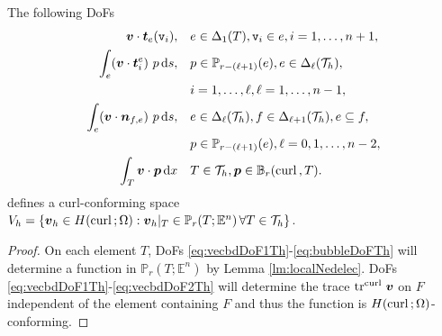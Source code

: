 \documentclass[10pt]{amsart}
\begin{document}
\begin{lemma}\label{lm:nedelec}
The following {\rm DoFs}
\begin{align}
\label{eq:vecbdDoF0Th}
\boldsymbol v\cdot \boldsymbol t_{e}(\texttt{v}_i), & \quad e\in \Delta_{1}(T), \texttt{v}_i\in e,  i=1,\ldots, n+1, \\
\label{eq:vecbdDoF1Th}
\int_e (\boldsymbol v\cdot \boldsymbol t_i^e)\ p \,{\rm d} s, &\quad  p\in \mathbb P_{r - (\ell +1)} (e), e\in \Delta_{\ell}(\mathcal T_h),\\
& \quad  i=1,\ldots, \ell, \ell = 1,\ldots, n-1, \notag\\
\label{eq:vecbdDoF2Th}
\int_e (\boldsymbol v\cdot \boldsymbol n_{f,e})\ p \,{\rm d} s, &\quad  e\in \Delta_{\ell}(\mathcal T_h), f\in \Delta_{\ell+1}(\mathcal T_h), e\subseteq f, \\
& \quad p\in \mathbb P_{r - (\ell +1)} (e), \ell = 0,1,\ldots, n-2, \notag\\
\int_T \boldsymbol v \cdot \boldsymbol p \,{\rm d}x&\quad T\in\mathcal T_h, \boldsymbol p\in \mathbb B_r({\rm curl\,}, T). \label{eq:bubbleDoFTh}
\end{align}
defines a curl-conforming space $V_h=\{\boldsymbol v_h\in H({\rm curl\,}; \Omega): \boldsymbol v_h|_T\in\mathbb P_r(T; \mathbb E^n) \, \forall T\in\mathcal T_h\}$.
\end{lemma}
\begin{proof}
On each element $T$, DoFs \eqref{eq:vecbdDoF1Th}-\eqref{eq:bubbleDoFTh} will determine a function in $\mathbb P_r(T; \mathbb E^n)$ by Lemma \ref{lm:localNedelec}. DoFs \eqref{eq:vecbdDoF1Th}-\eqref{eq:vecbdDoF2Th} will determine the trace $\operatorname{tr}^{{\rm curl\,}}\boldsymbol v$ on $F$ independent of the element containing $F$ and thus the function is $H({\rm curl\,};\Omega)$-conforming. 
\end{proof}
\end{document}
